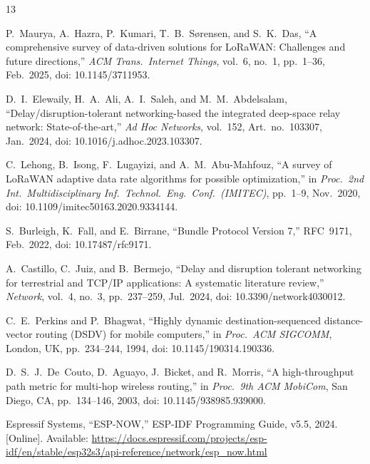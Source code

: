 \documentclass[conference]{IEEEtran}
\begin{document}
\balance
\begin{thebibliography}{13}

P.~Maurya, A.~Hazra, P.~Kumari, T.~B.~S{\o}rensen, and S.~K.~Das,
``A comprehensive survey of data-driven solutions for LoRaWAN: Challenges and future directions,''
\textit{ACM Trans.\ Internet Things}, vol.~6, no.~1, pp.~1--36, Feb.\ 2025,
doi: 10.1145/3711953.

D.~I.~Elewaily, H.~A.~Ali, A.~I.~Saleh, and M.~M.~Abdelsalam,
``Delay/disruption-tolerant networking-based the integrated deep-space relay network: State-of-the-art,''
\textit{Ad Hoc Networks}, vol.~152, Art.\ no.\ 103307, Jan.\ 2024,
doi: 10.1016/j.adhoc.2023.103307.

C.~Lehong, B.~Isong, F.~Lugayizi, and A.~M.~Abu-Mahfouz,
``A survey of LoRaWAN adaptive data rate algorithms for possible optimization,''
in \textit{Proc.\ 2nd Int.\ Multidisciplinary Inf.\ Technol.\ Eng.\ Conf.\ (IMITEC)},
pp.~1--9, Nov.\ 2020,
doi: 10.1109/imitec50163.2020.9334144.

S.~Burleigh, K.~Fall, and E.~Birrane,
``Bundle Protocol Version 7,''
RFC~9171, Feb.\ 2022,
doi: 10.17487/rfc9171.

A.~Castillo, C.~Juiz, and B.~Bermejo,
``Delay and disruption tolerant networking for terrestrial and TCP/IP applications: A systematic literature review,''
\textit{Network}, vol.~4, no.~3, pp.~237--259, Jul.\ 2024,
doi: 10.3390/network4030012.

C.~E.~Perkins and P.~Bhagwat,
``Highly dynamic destination-sequenced distance-vector routing (DSDV) for mobile computers,''
in \textit{Proc.\ ACM SIGCOMM}, London, UK, pp.~234--244, 1994,
doi: 10.1145/190314.190336.

D.~S.~J.~De~Couto, D.~Aguayo, J.~Bicket, and R.~Morris,
``A high-throughput path metric for multi-hop wireless routing,''
in \textit{Proc.\ 9th ACM MobiCom}, San Diego, CA, pp.~134--146, 2003,
doi: 10.1145/938985.939000.

Espressif Systems,
``ESP-NOW,''
ESP-IDF Programming Guide, v5.5, 2024. [Online]. Available: \url{https://docs.espressif.com/projects/esp-idf/en/stable/esp32s3/api-reference/network/esp_now.html}


\end{thebibliography}
\end{document}
